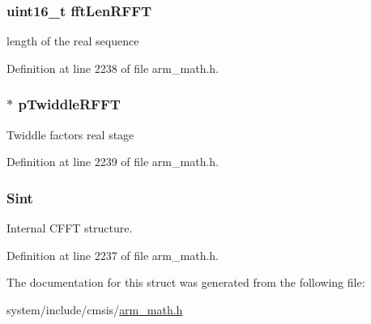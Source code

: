 \subsubsection[{\texorpdfstring{fft\+Len\+R\+F\+FT}{fftLenRFFT}}]{\setlength{\rightskip}{0pt plus 5cm}uint16\+\_\+t fft\+Len\+R\+F\+FT}\hypertarget{structarm__rfft__fast__instance__f32_a174f8c72d545034e19ba4ced52b31353}{}\label{structarm__rfft__fast__instance__f32_a174f8c72d545034e19ba4ced52b31353}
length of the real sequence 

Definition at line 2238 of file arm\+\_\+math.\+h.

\subsubsection[{\texorpdfstring{p\+Twiddle\+R\+F\+FT}{pTwiddleRFFT}}]{$\ast$ p\+Twiddle\+R\+F\+FT}\hypertarget{structarm__rfft__fast__instance__f32_a43370fe848d06993faf834da07ca91ce}{}\label{structarm__rfft__fast__instance__f32_a43370fe848d06993faf834da07ca91ce}
Twiddle factors real stage 

Definition at line 2239 of file arm\+\_\+math.\+h.

\subsubsection[{\texorpdfstring{Sint}{Sint}}]{ Sint}\hypertarget{structarm__rfft__fast__instance__f32_aa8a05a9fabc3852e5d476152a5067e53}{}\label{structarm__rfft__fast__instance__f32_aa8a05a9fabc3852e5d476152a5067e53}
Internal C\+F\+FT structure. 

Definition at line 2237 of file arm\+\_\+math.\+h.



The documentation for this struct was generated from the following file\+:\begin{DoxyCompactItemize}
\item 
system/include/cmsis/\hyperlink{arm__math_8h}{arm\+\_\+math.\+h}\end{DoxyCompactItemize}
